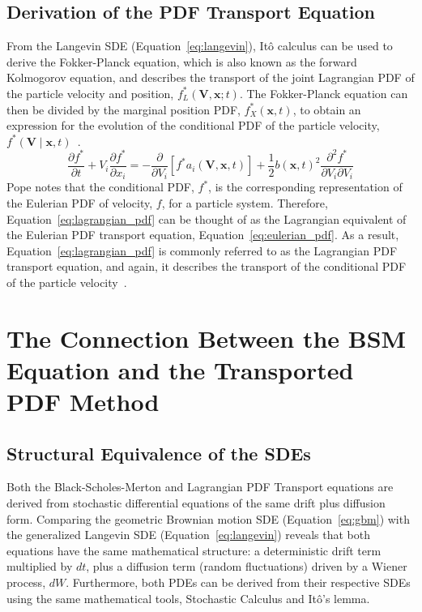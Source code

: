 \documentclass[12pt, onecolumn, journal]{IEEEtran}
\begin{document}
\subsection{Derivation of the PDF Transport Equation}
From the Langevin SDE (Equation~\ref{eq:langevin}), It\^{o} calculus can be used to derive the Fokker-Planck equation, which is also known as the forward Kolmogorov equation, and describes the transport of the joint Lagrangian PDF of the particle velocity and position, $ f^{*}_L(\mathbf{V}, \mathbf{x}; t)$. The Fokker-Planck equation can then be divided by the marginal position PDF, $f^{*}_X (\mathbf{x}, t)$, to obtain an expression for the evolution of the conditional PDF of the particle velocity, $f^*\left(\mathbf{V} \middle| \mathbf{x}, t\right)$~\cite{Pope2000}.
\begin{equation}
    \frac{\partial f^*}{\partial t} + V_i \frac{\partial f^*}{\partial x_i} = - \frac{\partial}{\partial V_i} \left[f^* a_i(\mathbf{V}, \mathbf{x}, t)\right] + \frac{1}{2} b{\left(\mathbf{x}, t\right)}^2 \frac{\partial^2 f^*}{\partial V_i \partial V_i}
    \label{eq:lagrangian_pdf}
\end{equation}
Pope notes that the conditional PDF, $f^*$, is the corresponding representation of the Eulerian PDF of velocity, $f$, for a particle system. Therefore, Equation~\ref{eq:lagrangian_pdf} can be thought of as the Lagrangian equivalent of the Eulerian PDF transport equation, Equation~\ref{eq:eulerian_pdf}. As a result, Equation~\ref{eq:lagrangian_pdf} is commonly referred to as the Lagrangian PDF transport equation, and again, it describes the transport of the conditional PDF of the particle velocity~\cite{Pope2000}.

\section{The Connection Between the BSM Equation and the Transported PDF Method}

\subsection{Structural Equivalence of the SDEs}
Both the Black-Scholes-Merton and Lagrangian PDF Transport equations are derived from stochastic differential equations of the same drift plus diffusion form. Comparing the geometric Brownian motion SDE (Equation~\ref{eq:gbm}) with the generalized Langevin SDE (Equation~\ref{eq:langevin}) reveals that both equations have the same mathematical structure: a deterministic drift term multiplied by $dt$, plus a diffusion term (random fluctuations) driven by a Wiener process, $dW$. Furthermore, both PDEs can be derived from their respective SDEs using the same mathematical tools, Stochastic Calculus and It\^{o}'s lemma.
\end{document}
